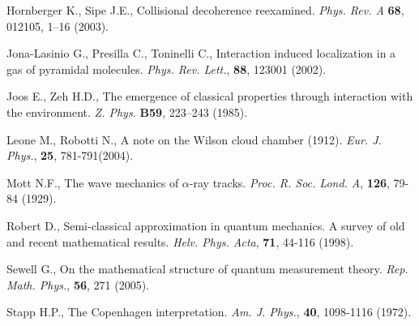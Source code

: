 \documentclass[12pt,reqno]{amsart}
\newcommand{\vs}{\vspace{0.5cm}}
\numberwithin{equation}{section}
\begin{document}
\begin{thebibliography}{99}
 Hornberger K., Sipe J.E., Collisional decoherence reexamined. 
{\em Phys. Rev. A} {\bf 68}, 012105, 1--16 (2003).

 Jona-Lasinio G., Presilla C., Toninelli C., Interaction induced localization in a gas of pyramidal molecules. {\em Phys. Rev. Lett.}, {\bf 88}, 123001 (2002).

 Joos E., Zeh H.D., The emergence of classical properties through
interaction with the environment. {\em Z. Phys.} {\bf B59}, 223--243
(1985).


 Leone M., Robotti N., A note on the Wilson cloud chamber (1912). {\em Eur. J. Phys.}, {\bf 25}, 781-791(2004). 

 Mott  N.F., The wave mechanics of $\alpha$-ray tracks. {\em Proc. R. Soc.
Lond. A}, {\bf  126}, 79-84 (1929).

 Robert D.,  Semi-classical approximation in quantum mechanics. A survey of old and recent mathematical results. {\em Helv. Phys. Acta}, {\bf 71}, 44-116 (1998).


 Sewell G., On the mathematical structure of quantum measurement theory. {\em Rep. Math. Phys.}, {\bf 56}, 271 (2005).

 Stapp H.P., The Copenhagen interpretation. {\em Am. J. Phys.}, {\bf 40}, 1098-1116 (1972).

\end{thebibliography}



\vs
\vs
\vs









\end{document}
